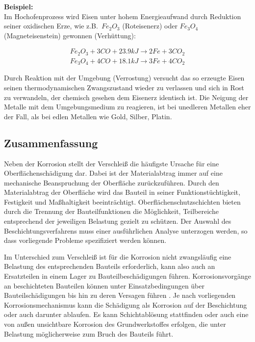 \documentclass[12pt,a4paper,bibliography=totocnumbered,listof=totocnumbered,fleqn]{scrartcl}
\begin{document}
\textbf{Beispiel:}\\
Im Hochofenprozess wird Eisen unter hohem Energieaufwand durch Reduktion seiner oxidischen Erze, wie z.B.\ $Fe_{2}O_{3}$ (Roteisenerz) oder $Fe_{3}O_{4}$ (Magneteisenstein) gewonnen (Verhüttung):

\begin{align*}
Fe_{2}O_{3} + 3CO + 23.9kJ \rightarrow 2Fe + 3CO_{2}\\
Fe_{3}O_{4} + 4CO + 18.1kJ \rightarrow 3Fe + 4CO_{2}
\end{align*}

Durch Reaktion mit der Umgebung (Verrostung) versucht das so erzeugte Eisen seinen thermodynamischen Zwangszustand wieder zu verlassen und sich in Rost zu verwandeln, der chemisch gesehen dem Eisenerz identisch ist.
Die Neigung der Metalle mit dem Umgebungsmedium zu reagieren, ist bei unedleren Metallen eher der Fall, als bei edlen Metallen wie Gold, Silber, Platin.

\subsection{Zusammenfassung}

Neben der Korrosion stellt der Verschleiß die häufigste Ursache für eine Oberflächenschädigung dar. Dabei ist der Materialabtrag immer auf eine mechanische Beanspruchung der Oberfläche zurückzuführen. Durch den Materialabtrag der Oberfläche wird das Bauteil in seiner Funktionstüchtigkeit, Festigkeit und Maßhaltigkeit beeinträchtigt. Oberflächenschutzschichten bieten durch die Trennung der Bauteilfunktionen die Möglichkeit, Teilbereiche entsprechend der jeweiligen Belastung gezielt zu schützen. Der Auswahl des Beschichtungsverfahrens muss einer ausführlichen Analyse unterzogen werden, so dass vorliegende Probleme spezifiziert werden können.

Im Unterschied zum Verschleiß ist für die Korrosion nicht zwangsläufig eine Belastung des entsprechenden Bauteils erforderlich, kann also auch an Ersatzteilen in einem Lager zu Bauteilbeschädigungen führen. Korrosionsvorgänge an beschichteten Bauteilen können unter Einsatzbedingungen über Bauteilschädigungen bis hin zu deren Versagen führen \citep{bach2005moderne}. Je nach vorliegenden Korrosionsmechanismus kann die Schädigung als Korrosion auf der Beschichtung oder auch darunter ablaufen. Es kann Schichtablösung stattfinden oder auch eine von außen unsichtbare Korrosion des Grundwerkstoffes erfolgen, die unter Belastung möglicherweise zum Bruch des Bauteils führt.
\end{document}
